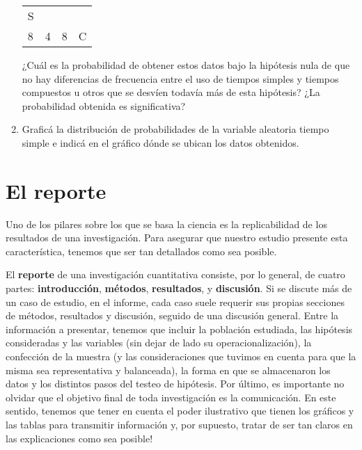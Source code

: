 \documentclass[12pt,spanish,a4paper,]{article}
\begin{document}
\begin{enumerate}
\begin{longtable}[]{@{}llll@{}}
\begin{minipage}[t]{0.09\columnwidth}
  S\strut
  \end{minipage}\tabularnewline
  \begin{minipage}[t]{0.06\columnwidth}\raggedright
  8\strut
  \end{minipage} & \begin{minipage}[t]{0.09\columnwidth}\raggedright
  4\strut
  \end{minipage} & \begin{minipage}[t]{0.12\columnwidth}\raggedright
  8\strut
  \end{minipage} & \begin{minipage}[t]{0.09\columnwidth}\raggedright
  C\strut
  \end{minipage}\tabularnewline
  \bottomrule
  \end{longtable}

  ¿Cuál es la probabilidad de obtener estos datos bajo la hipótesis nula
  de que no hay diferencias de frecuencia entre el uso de tiempos
  simples y tiempos compuestos u otros que se desvíen todavía más de
  esta hipótesis? ¿La probabilidad obtenida es significativa?
\item
  Graficá la distribución de probabilidades de la variable aleatoria
  tiempo simple e indicá en el gráfico dónde se ubican los datos
  obtenidos.
\end{enumerate}

\hypertarget{el-reporte}{%
\section{El reporte}\label{el-reporte}}

Uno de los pilares sobre los que se basa la ciencia es la replicabilidad
de los resultados de una investigación. Para asegurar que nuestro
estudio presente esta característica, tenemos que ser tan detallados
como sea posible.

El \textbf{reporte} de una investigación cuantitativa consiste, por lo
general, de cuatro partes: \textbf{introducción}, \textbf{métodos},
\textbf{resultados}, y \textbf{discusión}. Si se discute más de un caso
de estudio, en el informe, cada caso suele requerir sus propias
secciones de métodos, resultados y discusión, seguido de una discusión
general. Entre la información a presentar, tenemos que incluir la
población estudiada, las hipótesis consideradas y las variables (sin
dejar de lado su operacionalización), la confección de la muestra (y las
consideraciones que tuvimos en cuenta para que la misma sea
representativa y balanceada), la forma en que se almacenaron los datos y
los distintos pasos del testeo de hipótesis. Por último, es importante
no olvidar que el objetivo final de toda investigación es la
comunicación. En este sentido, tenemos que tener en cuenta el poder
ilustrativo que tienen los gráficos y las tablas para transmitir
información y, por supuesto, tratar de ser tan claros en las
explicaciones como sea posible!
\end{document}
